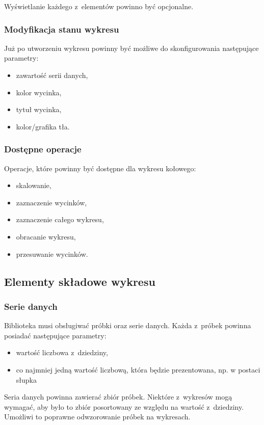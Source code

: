 \documentclass[11pt,twoside,a4paper,final]{article}
\begin{document}
Wyświetlanie każdego z~elementów powinno być opcjonalne. 

\subsubsection{Modyfikacja stanu wykresu}
Już po utworzeniu wykresu powinny być możliwe do skonfigurowania następujące parametry:
\begin{itemize}
\item{zawartość serii danych,}
\item{kolor wycinka,}
\item{tytuł wycinka,}
\item{kolor/grafika tła.}
\end{itemize}

\subsubsection{Dostępne operacje}
Operacje, które powinny być dostępne dla wykresu kołowego:
\begin{itemize}
\item{skalowanie,}
\item{zaznaczenie wycinków,}
\item{zaznaczenie całego wykresu,}
\item{obracanie wykresu,}
\item{przesuwanie wycinków.}
\end{itemize}

\subsection{Elementy składowe wykresu}
\subsubsection{Serie danych}
Biblioteka musi obsługiwać próbki oraz serie danych. Każda z~próbek powinna posiadać następujące parametry:
\begin{itemize}
\item{wartość liczbowa z~dziedziny,}
\item{co najmniej jedną wartość liczbową, która będzie prezentowana, np. w postaci słupka}
\end{itemize}

Seria danych powinna zawierać zbiór próbek. Niektóre z~wykresów mogą wymagać, aby było to zbiór posortowany ze względu na wartość z~dziedziny. Umożliwi to poprawne odwzorowanie próbek na wykresach.
\end{document}
